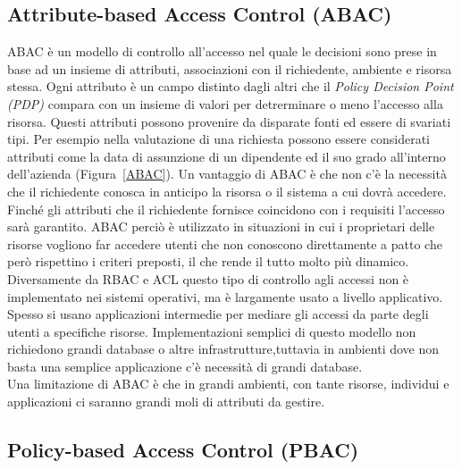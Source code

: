 
\subsection*{Attribute-based Access Control (ABAC)} %
\label{sub:attribute_based_access_control_}

ABAC è un modello di controllo all'accesso  nel quale le decisioni sono prese in base ad un insieme 
di attributi, associazioni con il richiedente, ambiente e risorsa stessa.
Ogni attributo è un campo distinto dagli altri che il \textit{Policy Decision Point (PDP)} compara con un insieme di valori per detrerminare o meno l'accesso alla risorsa.
Questi attributi possono provenire da disparate fonti ed essere di svariati tipi. Per esempio nella valutazione di una richiesta possono essere considerati attributi come la data di assunzione di un dipendente ed il suo grado all'interno dell'azienda (Figura~\ref{ABAC}). 
Un vantaggio di ABAC è che non c'è la necessità che il richiedente conosca in anticipo
la risorsa o il sistema a cui dovrà accedere. Finché gli attributi che il richiedente fornisce 
coincidono con i requisiti l'accesso sarà garantito. ABAC perciò è utilizzato in situazioni in 
cui i proprietari delle risorse vogliono far accedere utenti che non conoscono direttamente a patto che però rispettino i criteri preposti, il che rende il tutto molto più dinamico.\\
Diversamente da RBAC e ACL questo tipo di controllo agli 
accessi non è implementato nei sistemi operativi, ma è largamente usato a livello applicativo.
Spesso si usano applicazioni intermedie per mediare gli accessi da parte degli utenti a specifiche risorse.
Implementazioni semplici di questo modello non richiedono grandi database o altre infrastrutture,tuttavia in ambienti dove non basta una semplice applicazione c'è necessità di grandi database.\\
Una limitazione di ABAC è che in grandi ambienti, con tante risorse, individui e applicazioni ci saranno grandi moli di attributi da gestire.


\subsection*{Policy-based Access Control (PBAC)} %
\label{sub:policy_based_access_control_}

